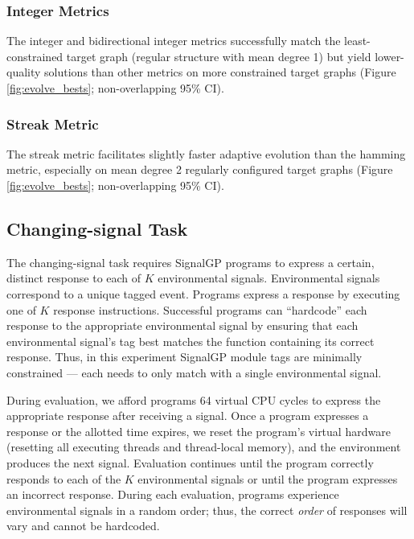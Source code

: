 \subsubsection{Integer Metrics}

The integer and bidirectional integer metrics successfully match the least-constrained target graph (regular structure with mean degree 1) but yield lower-quality solutions than other metrics on more constrained target graphs (Figure \ref{fig:evolve_bests}; non-overlapping 95\% CI).

\subsubsection{Streak Metric}

The streak metric facilitates slightly faster adaptive evolution than the hamming metric, especially on mean degree 2 regularly configured target graphs (Figure \ref{fig:evolve_bests}; non-overlapping 95\% CI).


\subsection{Changing-signal Task} \label{sec:changing-signal}



The changing-signal task requires SignalGP programs to express a certain, distinct response to each of $K$ environmental signals.
Environmental signals correspond to a unique tagged event.
Programs express a response by executing one of $K$ response instructions.
Successful programs can ``hardcode'' each response to the appropriate environmental signal by ensuring that each environmental signal's tag best matches the function containing its correct response.
Thus, in this experiment SignalGP module tags are minimally constrained --- each needs to only match with a single environmental signal.

During evaluation, we afford programs 64 virtual CPU cycles to express the appropriate response after receiving a signal.
Once a program expresses a response or the allotted time expires, we reset the program's virtual hardware (resetting all executing threads and thread-local memory), and the environment produces the next signal.
Evaluation continues until the program correctly responds to each of the $K$ environmental signals or until the program expresses an incorrect response.
During each evaluation, programs experience environmental signals in a random order; thus, the correct \textit{order} of responses will vary and cannot be hardcoded.

